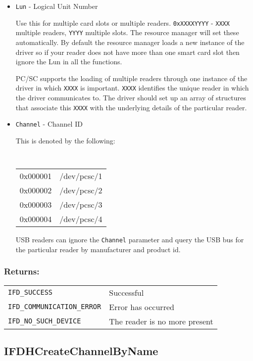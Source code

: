 \documentclass[a4paper,12pt]{article}
\newcommand{\returns}{\subsubsection{Returns:}}
\begin{document}
\begin{itemize}
\item \texttt{Lun} - Logical Unit Number

Use this for multiple card slots or multiple readers.
\texttt{0xXXXXYYYY} - \texttt{XXXX} multiple readers, \texttt{YYYY}
multiple slots. The resource manager will set these automatically. By
default the resource manager loads a new instance of the driver so if
your reader does not have more than one smart card slot then ignore the
Lun in all the functions.

PC/SC supports the loading of multiple readers through one instance of
the driver in which \texttt{XXXX} is important. \texttt{XXXX} identifies
the unique reader in which the driver communicates to. The driver should
set up an array of structures that associate this \texttt{XXXX} with the
underlying details of the particular reader.

\item \texttt{Channel} - Channel ID

This is denoted by the following:

{\tt
\begin{tabular}{ll}
0x000001 & /dev/pcsc/1\\
0x000002 & /dev/pcsc/2\\
0x000003 & /dev/pcsc/3\\
0x000004 & /dev/pcsc/4\\
\end{tabular}
}

USB readers can ignore the \texttt{Channel} parameter and query the USB
bus for the particular reader by manufacturer and product id.

\end{itemize}

\returns

\begin{tabular}{ll}
\texttt{IFD\_SUCCESS} & Successful\\
\texttt{IFD\_COMMUNICATION\_ERROR} & Error has occurred\\
\texttt{IFD\_NO\_SUCH\_DEVICE} & The reader is no more present\\
\end{tabular}


\subsection{IFDHCreateChannelByName}
\label{IFDHCreateChannelByName}
\end{document}
